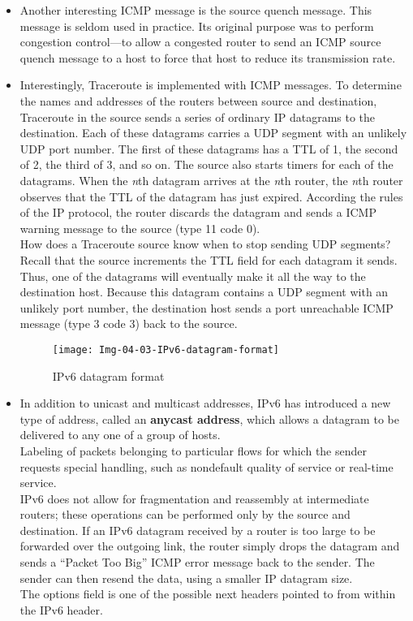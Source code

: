 \begin{itemize}
\item
Another interesting ICMP message is the source quench message. This message is seldom used in practice. Its original purpose was to perform congestion control---to allow a congested router to send an ICMP source quench message to a host to force that host to reduce its transmission rate.

\item
Interestingly, Traceroute is implemented with ICMP messages. To determine the names and addresses of the routers between source and destination, Traceroute in the source sends a series of ordinary IP datagrams to the destination. Each of these datagrams carries a UDP segment with an unlikely UDP port number. The first of these datagrams has a TTL of 1, the second of 2, the third of 3, and so on. The source also starts timers for each of the datagrams. When the \textit{n}th datagram arrives at the \textit{n}th router, the \textit{n}th router observes that the TTL of the datagram has just expired. According the rules of the IP protocol, the router discards the datagram and sends a ICMP warning message to the source (type 11 code 0).\\
How does a Traceroute source know when to stop sending UDP segments? Recall that the source increments the TTL field for each datagram it sends. Thus, one of the datagrams will eventually make it all the way to the destination host. Because this datagram contains a UDP segment with an unlikely port number, the destination host sends a port unreachable ICMP message (type 3 code 3) back to the source.

\begin{figure}[h]
\texttt{[image: Img-04-03-IPv6-datagram-format]}
\centering
\caption{IPv6 datagram format}
\label{fig:fig-04-03}
\end{figure}

\item
In addition to unicast and multicast addresses, IPv6 has introduced a new type of address, called an \textbf{anycast address}, which allows a datagram to be delivered to any one of a group of hosts.\\
Labeling of packets belonging to particular flows for which the sender requests special handling, such as nondefault quality of service or real-time service.\\
IPv6 does not allow for fragmentation and reassembly at intermediate routers; these operations can be performed only by the source and destination. If an IPv6 datagram received by a router is too large to be forwarded over the outgoing link, the router simply drops the datagram and sends a ``Packet Too Big'' ICMP error message back to the sender. The sender can then resend the data, using a smaller IP datagram size.\\
The options field is one of the possible next headers pointed to from within the IPv6 header.


\end{itemize}
